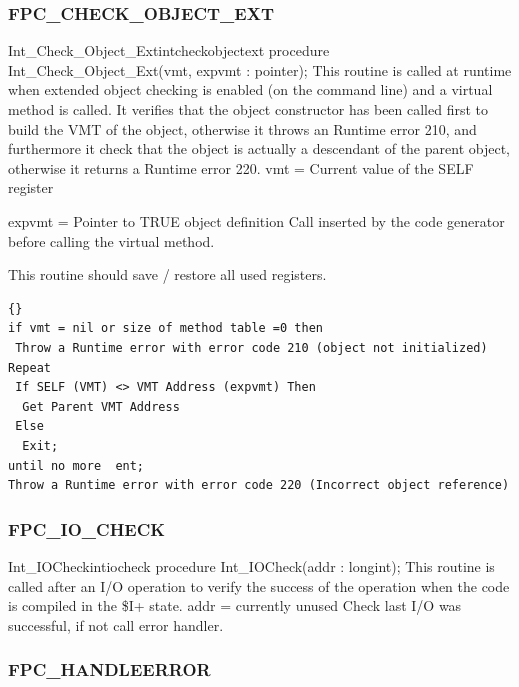 \documentclass [a4paper,12pt]{article}
\begin{document}
\subsubsection{FPC{\_}CHECK{\_}OBJECT{\_}EXT}
\label{subsubsec:mylabel56}

\begin{procedurel}{Int{\_}Check{\_}Object{\_}Ext}{intcheckobjectext}
\Declaration
procedure Int{\_}Check{\_}Object{\_}Ext(vmt, expvmt : pointer);
\Description
This routine is called at runtime when extended object checking is enabled (on the command line) and a virtual method is called. It verifies that the object constructor has been called first to build the VMT of the object, otherwise it throws an Runtime error 210, and furthermore it check that the object is actually a descendant of the parent object, otherwise it returns a Runtime error 220.
\Parameters
vmt = Current value of the SELF register \par
expvmt = Pointer to TRUE object definition
\Notes
Call inserted by the code generator before calling the virtual method. \par
This routine should save / restore all used registers.
\Algorithm
\begin{lstlisting}{}
if vmt = nil or size of method table =0 then
 Throw a Runtime error with error code 210 (object not initialized)
Repeat
 If SELF (VMT) <> VMT Address (expvmt) Then
  Get Parent VMT Address
 Else
  Exit; 
until no more  ent; 
Throw a Runtime error with error code 220 (Incorrect object reference)
\end{lstlisting}
\end{procedurel}

\subsubsection{FPC{\_}IO{\_}CHECK}
\label{subsubsec:mylabel57}

\begin{procedurel}{Int{\_}IOCheck}{intiocheck}
\Declaration
procedure Int{\_}IOCheck(addr : longint);
\Description
This routine is called after an I/O operation to verify the success of the
operation when the code is compiled in the {\$}I+ state.
\Parameters
addr = currently unused
\Algorithm
Check last I/O was successful, if not call error handler.
\end{procedurel}

\subsubsection{FPC{\_}HANDLEERROR}
\label{subsubsec:mylabel58}
\end{document}

